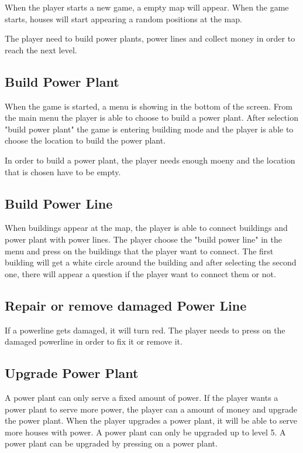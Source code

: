 	When the player starts a new game, a empty map will appear. When the game starts, 
	houses will start appearing a random positions at the map.

	The player need to build power plants, power lines and collect money in order
	to reach the next level.

\subsection*{Build Power Plant}

	When the game is started, a menu is showing in the bottom of the screen.
	From the main menu the player is able to choose to build a power plant.
	After selection "build power plant" the game is entering building mode and
	the player is able to choose the location to build the power plant. 

	In order to build a power plant, the player needs enough moeny and the
	location that is chosen have to be empty.

\subsection*{Build Power Line}

	When buildings appear at the map, the player is able to connect buildings and
	power plant with power lines. The player choose the "build power line" in the 
	menu and press on the buildings that the player want to connect. The first building
	will get a white circle around the building and after selecting the second one, there
	will appear a question if the player want to connect them or not.

\subsection*{Repair or remove damaged Power Line}

	If a powerline gets damaged, it will turn red. The player needs to press on the
	damaged powerline in order to fix it or remove it. 

\subsection*{Upgrade Power Plant}

	A power plant can only serve a fixed amount of power. If the player wants a power
	plant to serve more power, the player can a amount of money and upgrade the power plant. 
	When the player upgrades a power plant, it will be able to serve more houses with power.
	A power plant can only be upgraded up to level 5. A power plant can be upgraded by pressing
	on a power plant. 

